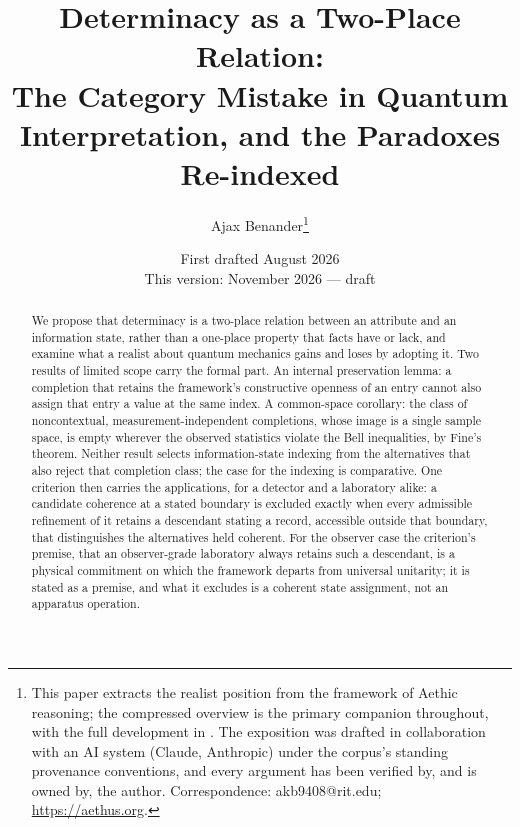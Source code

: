 \title{Determinacy as a Two-Place Relation:\\ The Category Mistake in Quantum Interpretation, and the Paradoxes Re-indexed}
\author{Ajax Benander\thanks{This paper extracts the realist position from the framework of Aethic reasoning; the compressed overview \cite{AethusBrief} is the primary companion throughout, with the full development in \cite{Aethus}. The exposition was drafted in collaboration with an AI system (Claude, Anthropic) under the corpus's standing provenance conventions, and every argument has been verified by, and is owned by, the author. Correspondence: akb9408@rit.edu; \url{https://aethus.org}.}}
\date{First drafted August 2026\\ {\small This version: November 2026 --- draft}}


\maketitle

\begin{abstract}
\noindent We propose that determinacy is a two-place relation between an attribute and an information state, rather than a one-place property that facts have or lack, and examine what a realist about quantum mechanics gains and loses by adopting it. Two results of limited scope carry the formal part. An internal preservation lemma: a completion that retains the framework's constructive openness of an entry cannot also assign that entry a value at the same index. A common-space corollary: the class of noncontextual, measurement-independent completions, whose image is a single sample space, is empty wherever the observed statistics violate the Bell inequalities, by Fine's theorem. Neither result selects information-state indexing from the alternatives that also reject that completion class; the case for the indexing is comparative. One criterion then carries the applications, for a detector and a laboratory alike: a candidate coherence at a stated boundary is excluded exactly when every admissible refinement of it retains a descendant stating a record, accessible outside that boundary, that distinguishes the alternatives held coherent. For the observer case the criterion's premise, that an observer-grade laboratory always retains such a descendant, is a physical commitment on which the framework departs from universal unitarity; it is stated as a premise, and what it excludes is a coherent state assignment, not an apparatus operation.
\end{abstract}

